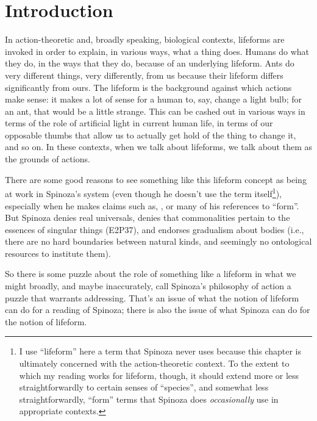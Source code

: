 \documentclass{article}
\newcommand{\dash}{\unskip{—}}
\begin{document}
\section{Introduction}

In action-theoretic \dash and, broadly speaking, biological \dash contexts, lifeforms are invoked in order to explain, in various ways, what a thing does.
Humans do what they do, in the ways that they do, because of an underlying lifeform. Ants do very different things, very differently, from us because their lifeform differs significantly from ours. The lifeform is the background against which actions make sense: it makes a lot of sense for a human to, say, change a light bulb; for an ant, that would be a little strange. This can be cashed out in various ways \dash in terms of the role of artificial light in current human life, in terms of our opposable thumbs that allow us to actually get hold of the thing to change it, and so on. In these contexts, when we talk about lifeforms, we talk about them as the grounds of actions.

There are some good reasons to see something like this lifeform concept as being at work in Spinoza's system (even though he doesn't use the term itself\footnote{I use \enquote{lifeform} here \dash a term that Spinoza never uses \dash because this chapter is ultimately concerned with the action-theoretic context. To the extent to which my reading works for lifeform, though, it should extend more or less straightforwardly to certain senses of \enquote{species}, and somewhat less straightforwardly, \enquote{form} \dash terms that Spinoza does \emph{occasionally} use in appropriate contexts.}), especially when he makes claims such as, , or many of his references to \enquote{form}. But Spinoza denies real universals, denies that commonalities pertain to the essences of singular things (E2P37), and endorses gradualism about bodies (i.e., there are no hard boundaries between natural kinds, and seemingly no ontological resources to institute them).

So there is some puzzle about the role of something like a lifeform in what we might broadly, and maybe inaccurately, call Spinoza's philosophy of action \dash a puzzle that warrants addressing. That's an issue of what the notion of lifeform can do for a reading of Spinoza; there is also the issue of what Spinoza can do for the notion of lifeform.
\end{document}
